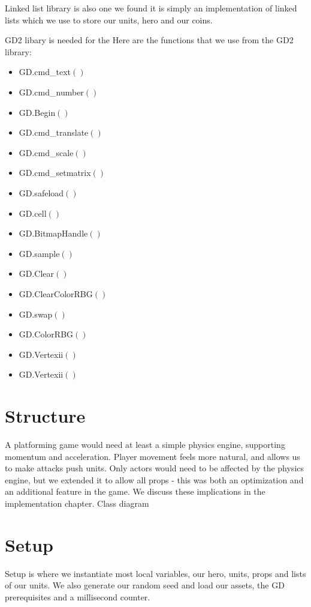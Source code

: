 Linked list library is also one we found it is simply an implementation of linked lists which we use to store our units, hero and our coins.

GD2 libary is needed for the
Here are the functions that we use from the GD2 library:
\begin{multicols}{3}
\begin{itemize}
    \item GD.cmd\_text$()$
    \item GD.cmd\_number$()$
    \item GD.Begin$()$
    \item GD.cmd\_translate$()$
    \item GD.cmd\_scale$()$
    \item GD.cmd\_setmatrix$()$
    \item GD.safeload$()$
    \item GD.cell$()$
    \item GD.BitmapHandle$()$
    \item GD.sample$()$
    \item GD.Clear$()$
    \item GD.ClearColorRBG$()$
    \item GD.swap$()$
    \item GD.ColorRBG$()$
    \item GD.Vertexii$()$
    \item GD.Vertexii$()$
\end{itemize}
\end{multicols}

\section{Structure} %
A platforming game would need at least a simple physics engine, supporting momentum and acceleration. Player movement feels more natural, and allows us to make attacks push units. Only actors would need to be affected by the physics engine, but we extended it to allow all props - this was both an optimization and an additional feature in the game. We discuss these implications in the implementation chapter.
\newline
Class diagram

\section{Setup}
Setup is where we instantiate most local variables, our hero, units, props and lists of our units. We also generate our random seed and load our assets, the GD prerequisites and a millisecond counter.

